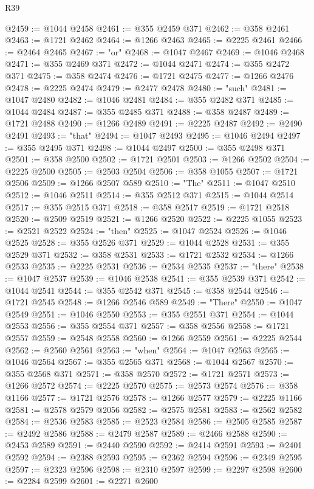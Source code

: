 \begin{lexlean}{R39}
\begin{coremodule}
@2459 := @1044 @2458
@2461 := @355 @2459 @371
@2462 := @358 @2461
@2463 := @1721 @2462
@2464 := @1266 @2463
@2465 := @2225 @2461
@2466 := @2464 @2465
@2467 := "or"
@2468 := @1047 @2467
@2469 := @1046 @2468
@2471 := @355 @2469 @371
@2472 := @1044 @2471
@2474 := @355 @2472 @371
@2475 := @358 @2474
@2476 := @1721 @2475
@2477 := @1266 @2476
@2478 := @2225 @2474
@2479 := @2477 @2478
@2480 := "such"
@2481 := @1047 @2480
@2482 := @1046 @2481
@2484 := @355 @2482 @371
@2485 := @1044 @2484
@2487 := @355 @2485 @371
@2488 := @358 @2487
@2489 := @1721 @2488
@2490 := @1266 @2489
@2491 := @2225 @2487
@2492 := @2490 @2491
@2493 := "that"
@2494 := @1047 @2493
@2495 := @1046 @2494
@2497 := @355 @2495 @371
@2498 := @1044 @2497
@2500 := @355 @2498 @371
@2501 := @358 @2500
@2502 := @1721 @2501
@2503 := @1266 @2502
@2504 := @2225 @2500
@2505 := @2503 @2504
@2506 := @358 @1055
@2507 := @1721 @2506
@2509 := @1266 @2507 @589
@2510 := "The"
@2511 := @1047 @2510
@2512 := @1046 @2511
@2514 := @355 @2512 @371
@2515 := @1044 @2514
@2517 := @355 @2515 @371
@2518 := @358 @2517
@2519 := @1721 @2518
@2520 := @2509 @2519
@2521 := @1266 @2520
@2522 := @2225 @1055
@2523 := @2521 @2522
@2524 := "then"
@2525 := @1047 @2524
@2526 := @1046 @2525
@2528 := @355 @2526 @371
@2529 := @1044 @2528
@2531 := @355 @2529 @371
@2532 := @358 @2531
@2533 := @1721 @2532
@2534 := @1266 @2533
@2535 := @2225 @2531
@2536 := @2534 @2535
@2537 := "there"
@2538 := @1047 @2537
@2539 := @1046 @2538
@2541 := @355 @2539 @371
@2542 := @1044 @2541
@2544 := @355 @2542 @371
@2545 := @358 @2544
@2546 := @1721 @2545
@2548 := @1266 @2546 @589
@2549 := "There"
@2550 := @1047 @2549
@2551 := @1046 @2550
@2553 := @355 @2551 @371
@2554 := @1044 @2553
@2556 := @355 @2554 @371
@2557 := @358 @2556
@2558 := @1721 @2557
@2559 := @2548 @2558
@2560 := @1266 @2559
@2561 := @2225 @2544
@2562 := @2560 @2561
@2563 := "when"
@2564 := @1047 @2563
@2565 := @1046 @2564
@2567 := @355 @2565 @371
@2568 := @1044 @2567
@2570 := @355 @2568 @371
@2571 := @358 @2570
@2572 := @1721 @2571
@2573 := @1266 @2572
@2574 := @2225 @2570
@2575 := @2573 @2574
@2576 := @358 @1166
@2577 := @1721 @2576
@2578 := @1266 @2577
@2579 := @2225 @1166
@2581 := @2578 @2579 @2056
@2582 := @2575 @2581
@2583 := @2562 @2582
@2584 := @2536 @2583
@2585 := @2523 @2584
@2586 := @2505 @2585
@2587 := @2492 @2586
@2588 := @2479 @2587
@2589 := @2466 @2588
@2590 := @2453 @2589
@2591 := @2440 @2590
@2592 := @2414 @2591
@2593 := @2401 @2592
@2594 := @2388 @2593
@2595 := @2362 @2594
@2596 := @2349 @2595
@2597 := @2323 @2596
@2598 := @2310 @2597
@2599 := @2297 @2598
@2600 := @2284 @2599
@2601 := @2271 @2600

\end{coremodule}
\end{lexlean}
